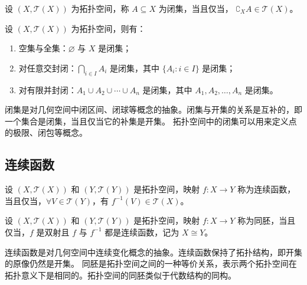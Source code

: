 \vspace{1em}

\begin{definition}
    设 $ (X,\mathcal{T}(X)) $ 为拓扑空间，称 $ A\subseteq X $ 为闭集，当且仅当， $ \complement_X A \in \mathcal{T}(X) $。
\end{definition}
\vspace{1em}

\begin{proposition}[闭集的性质]
    设 $ (X,\mathcal{T}(X)) $ 为拓扑空间，则有：
    \begin{enumerate}
        \item 空集与全集：$ \varnothing $ 与 $ X $ 是闭集；
        \item 对任意交封闭：$ \bigcap_{i\in I} A_i $ 是闭集，其中 $ \{A_i:i\in I\}$ 是闭集；
        \item 对有限并封闭：$ A_1\cup A_2\cup \cdots \cup A_n $ 是闭集，其中 $ A_1,A_2,\ldots,A_n $ 是闭集。
    \end{enumerate}
\end{proposition}

\begin{note}
    闭集是对几何空间中闭区间、闭球等概念的抽象。闭集与开集的关系是互补的，即一个集合是闭集，当且仅当它的补集是开集。
    拓扑空间中的闭集可以用来定义点的极限、闭包等概念。
\end{note}

\vspace{1em}
\subsection{连续函数}
\begin{definition}
    设 $ (X,\mathcal{T}(X)) $ 和 $ (Y,\mathcal{T}(Y)) $ 是拓扑空间，映射 $ f:X\to Y $ 称为连续函数，当且仅当，$ \forall V\in \mathcal{T}(Y) $，有 $ f^{-1}(V)\in \mathcal{T}(X) $。
\end{definition}
\begin{definition}[同胚 Homeomorphism]
    设 $ (X,\mathcal{T}(X)) $ 和 $ (Y,\mathcal{T}(Y)) $ 是拓扑空间，映射 $ f:X\to Y $ 称为同胚，当且仅当，$ f $ 是双射且 $ f $ 与 $ f^{-1} $ 都是连续函数，记为 $ X \cong Y $。
\end{definition}
\begin{note}
    连续函数是对几何空间中连续变化概念的抽象。连续函数保持了拓扑结构，即开集的原像仍然是开集。
    同胚是拓扑空间之间的一种等价关系，表示两个拓扑空间在拓扑意义下是相同的。拓扑空间的同胚类似于代数结构的同构。
\end{note}

